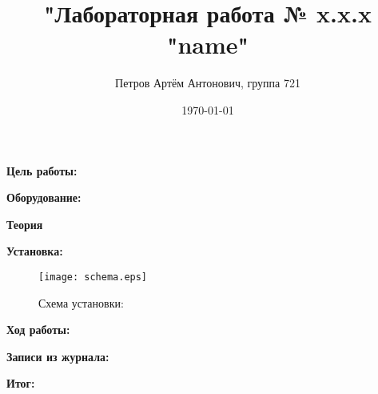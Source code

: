 \documentclass[a4paper,12pt]{article}
\author{Петров Артём Антонович, группа 721}
\title{"Лабораторная работа № x.x.x "name"}
\date{\today}
\begin{document}

\begin{minipage}[t][8cm]{\textwidth}
\maketitle
\end{minipage}


\textbf{Цель работы:} 
\bigskip

\textbf{Оборудование:} 
\bigskip

\textbf{Теория}
\bigskip


\bigskip

\textbf{Установка:}
\medskip


\begin{figure}[ht]
\centering
\texttt{[image: schema.eps]}
\caption{Схема установки: }\label{schema}
\end{figure}

\bigskip

\textbf{Ход работы:}
\bigskip


\bigskip

\textbf{Записи из журнала:}
\bigskip


\bigskip

\textbf{Итог:}
\bigskip
 
\end{document}
